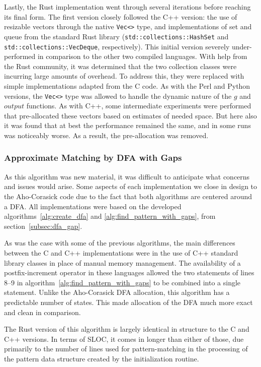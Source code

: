 Lastly, the Rust implementation went through several iterations before reaching its final form. The first version closely followed the C++ version: the use of resizable vectors through the native \texttt{Vec<>} type, and implementations of set and queue from the standard Rust library (\texttt{std::collections::HashSet} and \texttt{std::collections::VecDeque}, respectively). This initial version severely under-performed in comparison to the other two compiled languages. With help from the Rust community, it was determined that the two collection classes were incurring large amounts of overhead. To address this, they were replaced with simple implementations adapted from the C code. As with the Perl and Python versions, the \texttt{Vec<>} type was allowed to handle the dynamic nature of the $g$ and $output$ functions. As with C++, some intermediate experiments were performed that pre-allocated these vectors based on estimates of needed space. But here also it was found that at best the performance remained the same, and in some runs was noticeably worse. As a result, the pre-allocation was removed.

\subsubsection{Approximate Matching by DFA with Gaps}

As this algorithm was new material, it was difficult to anticipate what concerns and issues would arise. Some aspects of each implementation we close in design to the Aho-Corasick code due to the fact that both algorithms are centered around a DFA. All implementations were based on the developed algorithms~\ref{alg:create_dfa} and \ref{alg:find_pattern_with_gaps}, from section~\ref{subsec:dfa_gap}.

As was the case with some of the previous algorithms, the main differences between the C and C++ implementations were in the use of C++ standard library classes in place of manual memory management. The availability of a postfix-increment operator in these languages allowed the two statements of lines 8--9 in algorithm~\ref{alg:find_pattern_with_gaps} to be combined into a single statement. Unlike the Aho-Corasick DFA allocation, this algorithm has a predictable number of states. This made allocation of the DFA much more exact and clean in comparison.

The Rust version of this algorithm is largely identical in structure to the C and C++ versions. In terms of SLOC, it comes in longer than either of those, due primarily to the number of lines used for pattern-matching in the processing of the pattern data structure created by the initialization routine.


